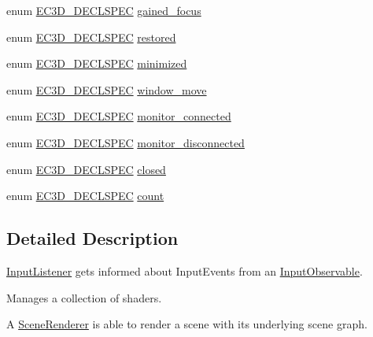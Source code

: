 \begin{DoxyCompactItemize}
\item 
enum \mbox{\hyperlink{_common_8h_aac42573e202ca3dd4d259c81691e2369}{E\+C3\+D\+\_\+\+D\+E\+C\+L\+S\+P\+EC}} \mbox{\hyperlink{namespaceec_a1e2dd185f2ea6b2729b32fec30917a0e}{gained\+\_\+focus}}
\item 
enum \mbox{\hyperlink{_common_8h_aac42573e202ca3dd4d259c81691e2369}{E\+C3\+D\+\_\+\+D\+E\+C\+L\+S\+P\+EC}} \mbox{\hyperlink{namespaceec_af316093f3fa4161f332a168bd91d598e}{restored}}
\item 
enum \mbox{\hyperlink{_common_8h_aac42573e202ca3dd4d259c81691e2369}{E\+C3\+D\+\_\+\+D\+E\+C\+L\+S\+P\+EC}} \mbox{\hyperlink{namespaceec_a5886b41b06c3a2522782c1129b38569d}{minimized}}
\item 
enum \mbox{\hyperlink{_common_8h_aac42573e202ca3dd4d259c81691e2369}{E\+C3\+D\+\_\+\+D\+E\+C\+L\+S\+P\+EC}} \mbox{\hyperlink{namespaceec_a435bfb057b6ec7278b405d423194057b}{window\+\_\+move}}
\item 
enum \mbox{\hyperlink{_common_8h_aac42573e202ca3dd4d259c81691e2369}{E\+C3\+D\+\_\+\+D\+E\+C\+L\+S\+P\+EC}} \mbox{\hyperlink{namespaceec_a2a1f0b9f84e0ccf8a264a846b5ca23ff}{monitor\+\_\+connected}}
\item 
enum \mbox{\hyperlink{_common_8h_aac42573e202ca3dd4d259c81691e2369}{E\+C3\+D\+\_\+\+D\+E\+C\+L\+S\+P\+EC}} \mbox{\hyperlink{namespaceec_ac7da3b2ff7c2bb148e07798a9e8e51f4}{monitor\+\_\+disconnected}}
\item 
enum \mbox{\hyperlink{_common_8h_aac42573e202ca3dd4d259c81691e2369}{E\+C3\+D\+\_\+\+D\+E\+C\+L\+S\+P\+EC}} \mbox{\hyperlink{namespaceec_a50f9b2ea9dbfffe311ceb6f857573272}{closed}}
\item 
enum \mbox{\hyperlink{_common_8h_aac42573e202ca3dd4d259c81691e2369}{E\+C3\+D\+\_\+\+D\+E\+C\+L\+S\+P\+EC}} \mbox{\hyperlink{namespaceec_a4dc8d59c4e90842e057344aefde0efbd}{count}}
\end{DoxyCompactItemize}


\subsection{Detailed Description}
\mbox{\hyperlink{classec_1_1_input_listener}{Input\+Listener}} gets informed about Input\+Events from an \mbox{\hyperlink{classec_1_1_input_observable}{Input\+Observable}}. 

Manages a collection of shaders.

A \mbox{\hyperlink{classec_1_1_scene_renderer}{Scene\+Renderer}} is able to render a scene with its underlying scene graph.

